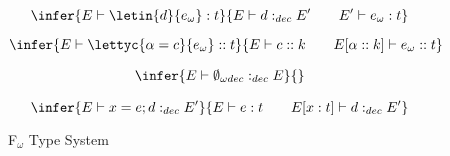 \begin{figure}
{           \begin{equation}
             \infer{E\vdash \letin{d}{e_\omega} : t}
             {E\vdash d :_{dec} E'\qquad E'\vdash e_\omega : t}
             \label{eq:flet}
           \end{equation}

           \begin{equation}
             \infer{E \vdash \lettyc{\alpha = c}{e_\omega} :: t}
             {E\vdash c :: k\qquad E[\alpha::k]\vdash e_\omega :: t}
             \label{eq:flettyc}
           \end{equation}


           \begin{equation}
             \infer{E\vdash \emptyset_{\omega dec} :_{dec} E}{\strut}
             \label{eq:fdecempty}
           \end{equation}

           \begin{equation}
             \infer{E\vdash x=e;d :_{dec} E'}
             {E\vdash e : t\qquad E[x:t]\vdash d :_{dec} E'}
             \label{eq:fdecrest}
             \end{equation}

       }
        \caption{F$_\omega$ Type System}
        \label{fig:fomegatype}
\end{figure}